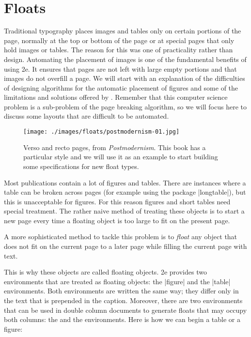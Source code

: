 
\chapter{Floats}

Traditional typography places images and tables only on certain portions of the page, normally at the top or bottom of the page or at special pages that only hold images or tables. The reason for this was one of practicality rather than design. 
Automating the placement of images is one of the fundamental benefits of using \latex2e. It ensures that pages are not left with large empty portions and that images do not overfill a page. We will start with an explanation of the difficulties of designing algorithms for the automatic placement of figures and some of the limitations and solutions offered by \latexe. Remember that this computer science problem is a sub-problem of the page breaking algorithm, so we will focus here to discuss some layouts that are difficult to be automated. 

\begin{figure}[htb]
\parindent=0pt
\texttt{[image: ./images/floats/postmodernism-01.jpg]}
\caption{Verso and recto pages, from \textit{Postmodernism}. This book has a particular style and we will use it as an example to start building some specifications for new float types.}
\label{fig:postmodern1}
\end{figure}

Most publications contain a lot of figures and tables. There are instances where
a table can be broken across pages (for example using the package |longtable|), but this is unacceptable for figures. For this reason
figures and short tables need special treatment. The rather naive method of treating these
objects is to start a new page every time a floating object is too large to fit on the present
page. 

A more sophisticated method to tackle this problem is to \emph{float} any object that
does not fit on the current page to a later page while filling the current page with text.

This is why these objects are called floating objects. \latex2e provides two environments
that are treated as floating objects: the |figure| and the |table| environments. Both environments
are written the same way; they differ only in the text that is prepended in the
caption. Moreover, there are two environments that can be used in double column documents
to generate floats that may occupy both columns: the  and the 
environments. Here is how we can begin a table or a figure:

